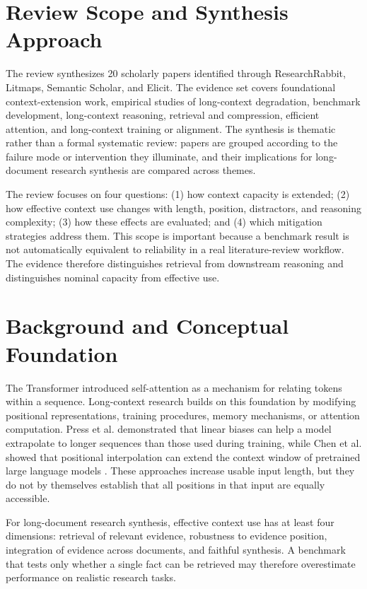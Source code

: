 \documentclass[manuscript,screen,oneside]{acmart}
\begin{document}
\section{Review Scope and Synthesis Approach}\label{sec:scope}
The review synthesizes 20 scholarly papers identified through ResearchRabbit, Litmaps, Semantic Scholar, and Elicit. The evidence set covers foundational context-extension work, empirical studies of long-context degradation, benchmark development, long-context reasoning, retrieval and compression, efficient attention, and long-context training or alignment. The synthesis is thematic rather than a formal systematic review: papers are grouped according to the failure mode or intervention they illuminate, and their implications for long-document research synthesis are compared across themes.

The review focuses on four questions: (1) how context capacity is extended; (2) how effective context use changes with length, position, distractors, and reasoning complexity; (3) how these effects are evaluated; and (4) which mitigation strategies address them. This scope is important because a benchmark result is not automatically equivalent to reliability in a real literature-review workflow. The evidence therefore distinguishes retrieval from downstream reasoning and distinguishes nominal capacity from effective use.

\section{Background and Conceptual Foundation}\label{sec:background}
The Transformer introduced self-attention as a mechanism for relating tokens within a sequence. Long-context research builds on this foundation by modifying positional representations, training procedures, memory mechanisms, or attention computation. Press et al. demonstrated that linear biases can help a model extrapolate to longer sequences than those used during training, while Chen et al. showed that positional interpolation can extend the context window of pretrained large language models \cite{press2022train,chen2023extending}. These approaches increase usable input length, but they do not by themselves establish that all positions in that input are equally accessible.

For long-document research synthesis, effective context use has at least four dimensions: retrieval of relevant evidence, robustness to evidence position, integration of evidence across documents, and faithful synthesis. A benchmark that tests only whether a single fact can be retrieved may therefore overestimate performance on realistic research tasks.
\end{document}
